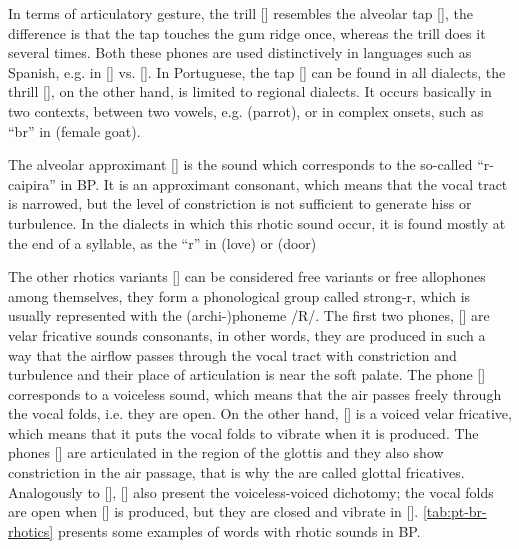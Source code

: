 In terms of articulatory gesture, the trill [] resembles the alveolar tap [], the difference is that the tap touches the gum ridge once, whereas the trill does it several times. Both these phones are used distinctively in languages such as Spanish, e.g. in  [] vs.  []. In Portuguese, the tap [] can be found in all dialects, the thrill [], on the other hand, is limited to regional dialects. It occurs basically in two contexts, between two vowels, e.g.  (parrot), or in complex onsets, such as ``br'' in  (female goat).

The alveolar approximant [] is the sound which corresponds to the so-called ``r-caipira'' in \ac{BP}. It is an approximant consonant, which means that the vocal tract is narrowed, but the level of constriction is not sufficient to generate hiss or turbulence. In the dialects in which this rhotic sound occur, it is found mostly at the end of a syllable, as the ``r'' in  (love) or  (door)

The other rhotics variants [] can be considered free variants or free allophones among themselves, they form a phonological group called strong-r, which is usually represented with the (archi-)phoneme /R/. The first two phones, [] are velar fricative sounds consonants, in other words, they are produced in such a way that the airflow passes through the vocal tract with constriction and turbulence and their place of articulation is near the soft palate. The phone [] corresponds to a voiceless sound, which means that the air passes freely through the vocal folds, i.e. they are open. On the other hand, [] is a voiced velar fricative, which means that it puts the vocal folds to vibrate when it is produced. The phones [] are articulated in the region of the glottis and they also show constriction in the air passage, that is why the are called glottal fricatives. Analogously to [], [] also present the voiceless-voiced dichotomy; the vocal folds are open when [] is produced, but they are closed and vibrate in []. \autoref{tab:pt-br-rhotics} presents some examples of words with rhotic sounds in \ac{BP}.

